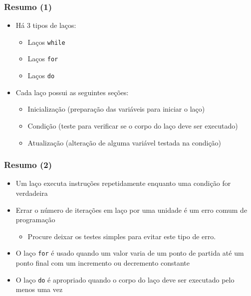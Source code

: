 \documentclass[xcolor={dvipsnames,table},aspectratio=169]{beamer}
\begin{document}
\begin{frame}\frametitle{Resumo (1)}
\begin{itemize}
	\item Há 3 tipos de laços:
	\begin{itemize}
		\item Laços \texttt{while}
		\item Laços \texttt{for}
		\item Laços \texttt{do}
	\end{itemize}
	\item Cada laço possui as seguintes seções:
	\begin{itemize}
		\item Inicialização (preparação das variáveis para iniciar o laço)
		\item Condição (teste para verificar se o corpo do laço deve ser executado)
		\item Atualização (alteração de alguma variável testada na condição)
	\end{itemize}
\end{itemize}
\end{frame}

\begin{frame}\frametitle{Resumo (2)}
\begin{itemize}
	\item Um laço executa instruções repetidamente enquanto uma condição for verdadeira
	\item Errar o número de iterações em laço por uma unidade é um erro comum de programação
	\begin{itemize}
		\item Procure deixar os testes simples para evitar este tipo de erro.
	\end{itemize}
	\item O laço \texttt{for} é usado quando um valor varia de um ponto de partida até um ponto final com um incremento ou decremento constante
	\item O laço \texttt{do} é apropriado quando o corpo do laço deve ser executado pelo menos uma vez
\end{itemize}
\end{frame}
\end{document}
